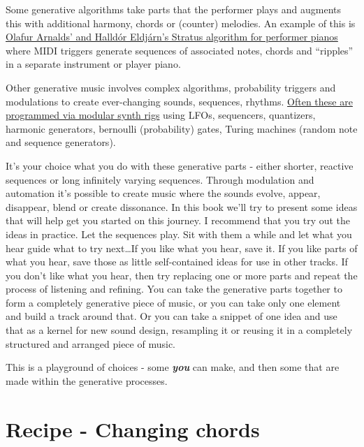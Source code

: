 \documentclass[
  12pt,
  letterpaper,
  oneside,
  open=any]{scrbook}
\begin{document}
Some generative algorithms take parts that the performer plays and
augments this with additional harmony, chords or (counter) melodies. An
example of this is
\href{https://www.youtube.com/watch?v=ktxkEBT5CB0}{Olafur Arnalds' and
Halldór Eldjárn's Stratus algorithm for performer pianos} where MIDI
triggers generate sequences of associated notes, chords and ``ripples''
in a separate instrument or player piano.

Other generative music involves complex algorithms, probability triggers
and modulations to create ever-changing sounds, sequences, rhythms.
\href{https://www.youtube.com/watch?v=uNz1XfVfJak}{Often these are
programmed via modular synth rigs} using LFOs, sequencers, quantizers,
harmonic generators, bernoulli (probability) gates, Turing machines
(random note and sequence generators).

It's your choice what you do with these generative parts - either
shorter, reactive sequences or long infinitely varying sequences.
Through modulation and automation it's possible to create music where
the sounds evolve, appear, disappear, blend or create dissonance. In
this book we'll try to present some ideas that will help get you started
on this journey. I recommend that you try out the ideas in practice. Let
the sequences play. Sit with them a while and let what you hear guide
what to try next\ldots If you like what you hear, save it. If you like
parts of what you hear, save those as little self-contained ideas for
use in other tracks. If you don't like what you hear, then try replacing
one or more parts and repeat the process of listening and refining. You
can take the generative parts together to form a completely generative
piece of music, or you can take only one element and build a track
around that. Or you can take a snippet of one idea and use that as a
kernel for new sound design, resampling it or reusing it in a completely
structured and arranged piece of music.

This is a playground of choices - some \textbf{\emph{you}} can make, and
then some that are made within the generative processes.


\chapter{Recipe - Changing
chords}\label{Chapter-001-Recipe-Changing_Chords}
\end{document}
